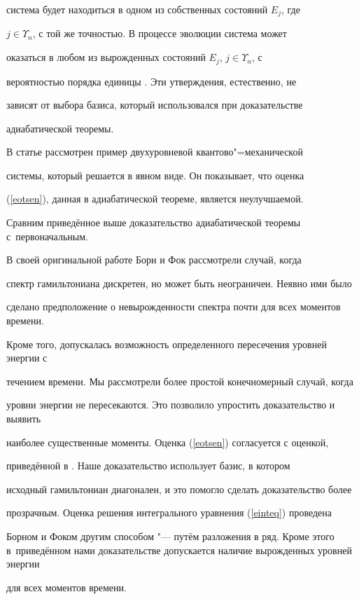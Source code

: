 система будет находиться в одном из собственных состояний $E_j$, где

$j\in\Upsilon_n$, с той же точностью. В процессе эволюции система может

оказаться в любом из вырожденных состояний $E_j$, $j\in\Upsilon_n$, с

вероятностью порядка единицы \cite{Katana11BR}. Эти утверждения, естественно, не

зависят от выбора базиса, который использовался при доказательстве

адиабатической теоремы.



В статье \cite{Katana11BR} рассмотрен пример двухуровневой квантово"=механической

системы, который решается в явном виде. Он показывает, что оценка

(\ref{eotsen}), данная в адиабатической теореме, является неулучшаемой.



Сравним приведённое выше доказательство адиабатической теоремы с~первоначальным.

В своей оригинальной работе \cite{BorFoc28} Борн и Фок рассмотрели случай, когда

спектр гамильтониана дискретен, но может быть неограничен. Неявно ими было

сделано предположение о невырожденности спектра почти для всех моментов времени.

Кроме того, допускалась возможность определенного пересечения уровней энергии с

течением времени. Мы рассмотрели более простой конечномерный случай, когда

уровни энергии не пересекаются. Это позволило упростить доказательство и выявить

наиболее существенные моменты. Оценка (\ref{eotsen}) согласуется с оценкой,

приведённой в \cite{BorFoc28}. Наше доказательство использует базис, в котором

исходный гамильтониан диагонален, и это помогло сделать доказательство более

прозрачным. Оценка решения интегрального уравнения (\ref{einteq}) проведена

Борном и Фоком другим способом "--- путём разложения в ряд. Кроме этого в~приведённом нами доказательстве допускается наличие вырожденных уровней энергии

для всех моментов времени.



